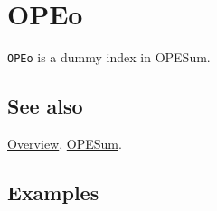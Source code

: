 \documentclass[../FeynCalcManual.tex]{subfiles}
\begin{document}
\hypertarget{opeo}{
\section{OPEo}\label{opeo}}

\texttt{OPEo} is a dummy index in OPESum.

\subsection{See also}

\hyperlink{toc}{Overview}, \hyperlink{opesum}{OPESum}.

\subsection{Examples}
\end{document}
